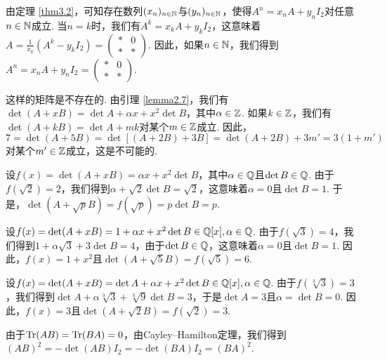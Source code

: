 \begin{solution}
  由定理 \ref{thm3.2}，可知存在数列$(x_n)_{n\in\mathbb N}$与$(y_n)_{n\in\mathbb N}$，使得$A^n=x_nA+y_nI_2$对任意$n\in\mathbb N$成立. 当$n=k$时，我们有$A^k=x_kA+y_kI_2$，这意味着$A=\frac1{x_k}(A^k-y_kI_2)=\begin{pmatrix}
    \ast & 0 \\
    \ast & \ast
  \end{pmatrix}$. 因此，如果$n\in\mathbb N$，我们得到$A^n=x_nA+y_nI_2=\begin{pmatrix}
    \ast & 0 \\
    \ast & \ast
  \end{pmatrix}$.
\end{solution}

\begin{solution}
  这样的矩阵是不存在的. 由引理 \ref{lemma2.7}，我们有$\det(A+xB)=\det A+\alpha x+x^2\det B$，其中$\alpha\in\mathbb Z$. 如果$k\in\mathbb Z$，我们有$\det(A+kB)=\det A+mk$对某个$m\in\mathbb Z$成立. 因此，
  \[
    7 = \det(A + 5B) = \det[ (A + 2B) + 3B ]
    = \det (A + 2B) + 3m' = 3(1 + m')
  \]
  对某个$m'\in\mathbb Z$成立，这是不可能的.
\end{solution}

\begin{solution}
  设$f(x)=\det(A+xB)=\alpha x+x^2\det B$，其中$
  \alpha\in\mathbb Q$且$\det B\in\mathbb Q$. 由于$f(\sqrt2)=2$，我们得到$\alpha+\sqrt2\det B=\sqrt2$，这意味着$\alpha=0$且$\det B=1$. 于是，$\det(A+\sqrt pB)=f(\sqrt p)=p\det B=p$.
\end{solution}

\begin{solution}
  设$f(x)=\det(A+xB)=1+\alpha x+x^2\det B\in\mathbb Q[x],\alpha\in\mathbb Q$. 由于$f(\sqrt3)=4$，我们得到$1+\alpha\sqrt3+3\det B=4$，由于$\det B\in\mathbb Q$，这意味着$\alpha=0$且$\det B=1$. 因此，$f(x)=1+x^2$且$\det(A+\sqrt5B)=f(\sqrt5)=6$.
\end{solution}

\begin{solution}
  设$f(x)=\det(A+xB)=\det A+\alpha x+x^2\det B\in\mathbb Q[x],\alpha\in\mathbb Q$. 由于$f(\sqrt[3]3)=3$，我们得到$\det A+\alpha\sqrt[3]3+\sqrt[3]9\det B=3$，于是$\det A=3$且$\alpha=\det B=0$. 因此，$f(x)=3$且$\det(A+\sqrt2B)=f(\sqrt2)=3$.
\end{solution}

\begin{solution}
  由于$\operatorname{Tr}(AB)=\operatorname{Tr}(BA)=0$，由Cayley--Hamilton定理，我们得到$(AB)^2=-\det(AB)I_2=-\det(BA)I_2=(BA)^2$.
\end{solution}

